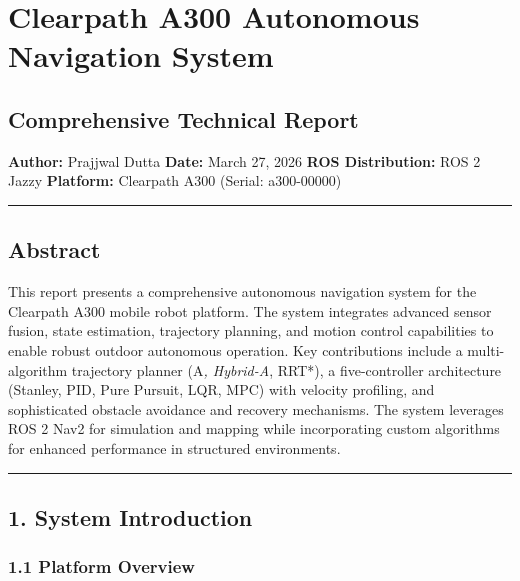 \hypertarget{clearpath-a300-autonomous-navigation-system}{%
\section{Clearpath A300 Autonomous Navigation
System}\label{clearpath-a300-autonomous-navigation-system}}

\hypertarget{comprehensive-technical-report}{%
\subsection{Comprehensive Technical
Report}\label{comprehensive-technical-report}}

\textbf{Author:} Prajjwal Dutta \textbf{Date:} March 27, 2026
\textbf{ROS Distribution:} ROS 2 Jazzy \textbf{Platform:} Clearpath A300
(Serial: a300-00000)

\begin{center}\rule{0.5\linewidth}{0.5pt}\end{center}

\hypertarget{abstract}{%
\subsection{Abstract}\label{abstract}}

This report presents a comprehensive autonomous navigation system for
the Clearpath A300 mobile robot platform. The system integrates advanced
sensor fusion, state estimation, trajectory planning, and motion control
capabilities to enable robust outdoor autonomous operation. Key
contributions include a multi-algorithm trajectory planner (A\emph{,
Hybrid-A}, RRT*), a five-controller architecture (Stanley, PID, Pure
Pursuit, LQR, MPC) with velocity profiling, and sophisticated obstacle
avoidance and recovery mechanisms. The system leverages ROS 2 Nav2 for
simulation and mapping while incorporating custom algorithms for
enhanced performance in structured environments.

\begin{center}\rule{0.5\linewidth}{0.5pt}\end{center}

\hypertarget{system-introduction}{%
\subsection{1. System Introduction}\label{system-introduction}}

\hypertarget{platform-overview}{%
\subsubsection{1.1 Platform Overview}\label{platform-overview}}


